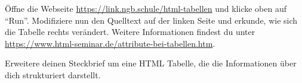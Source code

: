 \documentclass[10pt, a4paper]{arbeitsblatt}
\begin{document}
\begin{aufgabe}[icon=\iconLaptop]
	Öffne die Webseite \url{https://link.ngb.schule/html-tabellen} und
	klicke oben auf \enquote{Run}. Modifiziere nun den Quelltext auf der
	linken Seite und erkunde, wie sich die Tabelle rechts verändert.
	Weitere Informationen findest du unter
	\url{https://www.html-seminar.de/attribute-bei-tabellen.htm}.
\end{aufgabe}

\begin{aufgabe}[icon=\iconLaptop]
	Erweitere deinen Steckbrief um eine HTML Tabelle, die die Informationen
	über dich strukturiert darstellt.
\end{aufgabe}

\end{document}

